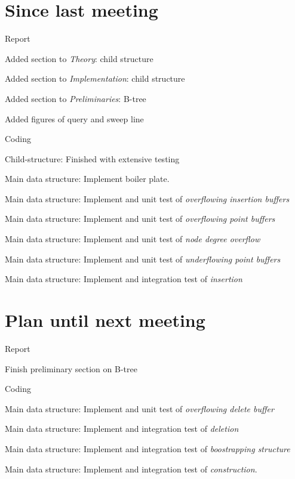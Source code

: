\documentclass[a4paper,11pt,agenda,chair]{meetingmins}
\begin{document}
\maketitle

\section{Since last meeting}
\begin{items}
\item Report
	\begin{items}
		\item Added section to \textit{Theory}: child structure
		\item Added section to \textit{Implementation}: child structure
        \item Added section to \textit{Preliminaries}: B-tree
        \item Added figures of query and sweep line
	\end{items}
\item Coding
	\begin{items}
		\item Child-structure: Finished with extensive testing
		\item Main data structure: Implement boiler plate.
		\item Main data structure: Implement and unit test of \textit{overflowing insertion buffers}
		\item Main data structure: Implement and unit test of \textit{overflowing point buffers}
		\item Main data structure: Implement and unit test of \textit{node degree overflow}
		\item Main data structure: Implement and unit test of \textit{underflowing point buffers}
		\item Main data structure: Implement and integration test of \textit{insertion}
	\end{items}
\end{items}

\section{Plan until next meeting}
\begin{items}
\item Report
	\begin{items}
		\item Finish preliminary section on B-tree
	\end{items}
\item Coding
	\begin{items}
		\item Main data structure: Implement and unit test of \textit{overflowing delete buffer}
		\item Main data structure: Implement and integration test of \textit{deletion}
		\item Main data structure: Implement and integration test of \textit{boostrapping structure}
		\item Main data structure: Implement and integration test of \textit{construction}.
	\end{items}
\end{items}
\end{document}

